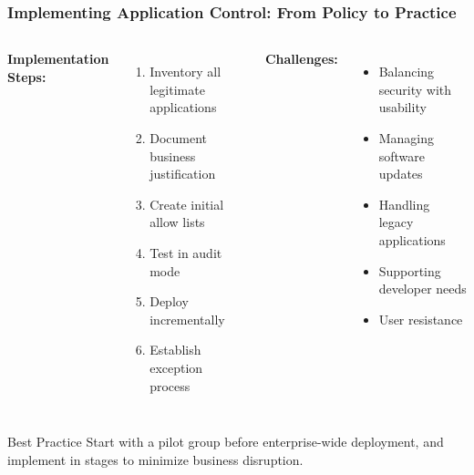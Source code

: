 \documentclass{beamer}
\begin{document}
    \begin{frame}
    \frametitle{Implementing Application Control: From Policy to Practice}
    
    \begin{columns}[T]
    \textbf{Implementation Steps:}
    \begin{enumerate}
    \item Inventory all legitimate applications
    \item Document business justification
    \item Create initial allow lists
    \item Test in audit mode
    \item Deploy incrementally
    \item Establish exception process
    \end{enumerate}
    
    \textbf{Challenges:}
    \begin{itemize}
    \item Balancing security with usability
    \item Managing software updates
    \item Handling legacy applications
    \item Supporting developer needs
    \item User resistance
    \end{itemize}
    \end{columns}
    
    \vspace{0.5cm}
    \begin{alertblock}{Best Practice}
    Start with a pilot group before enterprise-wide deployment, and implement in stages to minimize business disruption.
    \end{alertblock}
    
    \end{frame}
\end{document}
